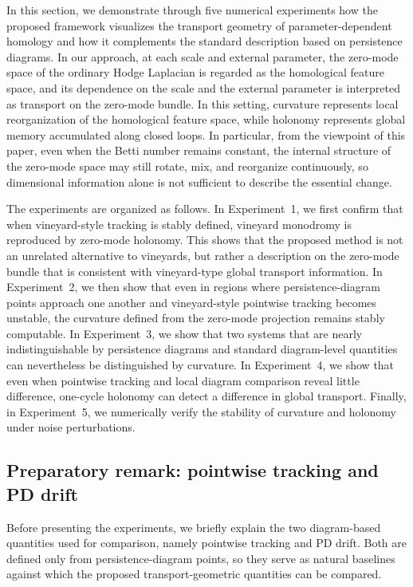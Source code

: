 \documentclass[pdflatex,sn-mathphys-num]{sn-jnl}%
\theoremstyle{thmstyleone}%
\theoremstyle{thmstyletwo}%
\theoremstyle{thmstylethree}%
\begin{document}
In this section, we demonstrate through five numerical experiments how the proposed framework visualizes the transport geometry of parameter-dependent homology and how it complements the standard description based on persistence diagrams. In our approach, at each scale and external parameter, the zero-mode space of the ordinary Hodge Laplacian is regarded as the homological feature space, and its dependence on the scale and the external parameter is interpreted as transport on the zero-mode bundle. In this setting, curvature represents local reorganization of the homological feature space, while holonomy represents global memory accumulated along closed loops. In particular, from the viewpoint of this paper, even when the Betti number remains constant, the internal structure of the zero-mode space may still rotate, mix, and reorganize continuously, so dimensional information alone is not sufficient to describe the essential change.

The experiments are organized as follows. In Experiment~1, we first confirm that when vineyard-style tracking is stably defined, vineyard monodromy is reproduced by zero-mode holonomy. This shows that the proposed method is not an unrelated alternative to vineyards, but rather a description on the zero-mode bundle that is consistent with vineyard-type global transport information. In Experiment~2, we then show that even in regions where persistence-diagram points approach one another and vineyard-style pointwise tracking becomes unstable, the curvature defined from the zero-mode projection remains stably computable. In Experiment~3, we show that two systems that are nearly indistinguishable by persistence diagrams and standard diagram-level quantities can nevertheless be distinguished by curvature. In Experiment~4, we show that even when pointwise tracking and local diagram comparison reveal little difference, one-cycle holonomy can detect a difference in global transport. Finally, in Experiment~5, we numerically verify the stability of curvature and holonomy under noise perturbations.

\subsection{Preparatory remark: pointwise tracking and PD drift}

Before presenting the experiments, we briefly explain the two diagram-based quantities used for comparison, namely pointwise tracking and PD drift. Both are defined only from persistence-diagram points, so they serve as natural baselines against which the proposed transport-geometric quantities can be compared.
\end{document}
